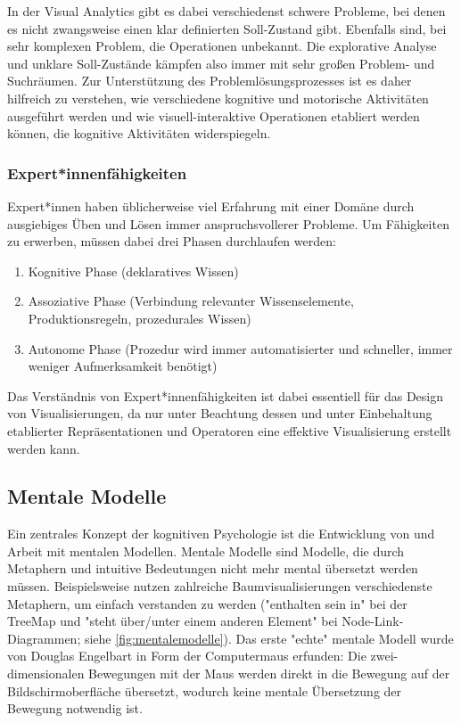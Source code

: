 			In der Visual Analytics gibt es dabei verschiedenst schwere Probleme, bei denen es nicht zwangsweise einen klar definierten Soll-Zustand gibt. Ebenfalls sind, bei sehr komplexen Problem, die Operationen unbekannt. Die explorative Analyse und unklare Soll-Zustände kämpfen also immer mit sehr großen Problem- und Suchräumen. Zur Unterstützung des Problemlösungsprozesses ist es daher hilfreich zu verstehen, wie verschiedene kognitive und motorische Aktivitäten ausgeführt werden und wie visuell-interaktive Operationen etabliert werden können, die kognitive Aktivitäten widerspiegeln.

		\subsubsection{Expert*innenfähigkeiten}
			Expert*innen haben üblicherweise viel Erfahrung mit einer Domäne durch ausgiebiges Üben und Lösen immer anspruchsvollerer Probleme. Um Fähigkeiten zu erwerben, müssen dabei drei Phasen durchlaufen werden:
			\begin{enumerate}
				\item Kognitive Phase (deklaratives Wissen)
				\item Assoziative Phase (Verbindung relevanter Wissenselemente, Produktionsregeln, prozedurales Wissen)
				\item Autonome Phase (Prozedur wird immer automatisierter und schneller, immer weniger Aufmerksamkeit benötigt)
			\end{enumerate}
			Das Verständnis von Expert*innenfähigkeiten ist dabei essentiell für das Design von Visualisierungen, da nur unter Beachtung dessen und unter Einbehaltung etablierter Repräsentationen und Operatoren eine effektive Visualisierung erstellt werden kann.

	\subsection{Mentale Modelle}
		Ein zentrales Konzept der kognitiven Psychologie ist die Entwicklung von und Arbeit mit mentalen Modellen. Mentale Modelle sind Modelle, die durch Metaphern und intuitive Bedeutungen nicht mehr mental übersetzt werden müssen. Beispielsweise nutzen zahlreiche Baumvisualisierungen verschiedenste Metaphern, um einfach verstanden zu werden (\bspw "enthalten sein in" bei der TreeMap und "steht über/unter einem anderen Element" bei Node-Link-Diagrammen; siehe \autoref{fig:mentalemodelle}). Das erste "echte" mentale Modell wurde von Douglas Engelbart in Form der Computermaus erfunden: Die zwei-dimensionalen Bewegungen mit der Maus werden direkt in die Bewegung auf der Bildschirmoberfläche übersetzt, wodurch keine mentale Übersetzung der Bewegung notwendig ist.

